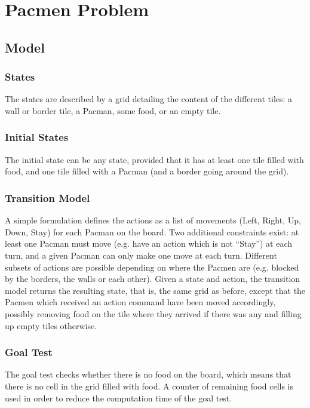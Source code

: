 \documentclass[journal]{IEEEtran}
\newcommand{\py}[1]{\texttt{#1}}
\begin{document}
\section{Pacmen Problem}
\subsection{Model}
\subsubsection{States}
The states are described by a grid detailing the content of the different tiles: a wall or border tile, a Pacman, some food, or an empty tile.
\subsubsection{Initial States}
The initial state can be any state, provided that it has at least one tile filled with food, and one tile filled with a Pacman (and a border going around the grid).

\subsubsection{Transition Model}
A simple formulation defines the actions as a list of movements (Left, Right, Up, Down, Stay) for each Pacman on the board.
Two additional constraints exist: at least one Pacman must move (e.g. have an action which is not ``Stay'') at each turn, and a given Pacman can only make one move at each turn.
Different subsets of actions are possible depending on where the Pacmen are (e.g. blocked by the borders, the walls or each other). 
Given a state and action, the transition model returns the resulting state, that is, the same grid as before, except that the Pacmen which received an action command have been moved accordingly, possibly removing food on the tile where they arrived if there was any and filling up empty tiles otherwise.

\subsubsection{Goal Test}
The goal test checks whether there is no food on the board, which means that there is no cell in the grid filled with food.
A counter of remaining food cells is used in order to reduce the computation time of the goal test.
\end{document}
